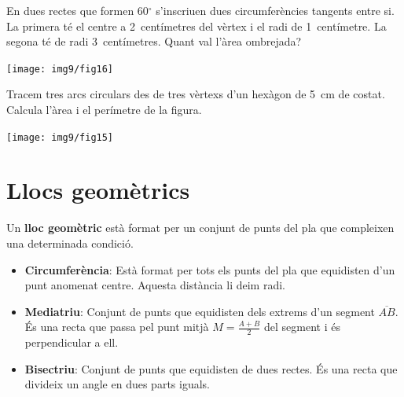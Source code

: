\begin{mylist}
 
\vspace{-1.5cm}
\exer \begin{minipage}[t]{0.62\textwidth}
	En dues rectes que formen 60${}^\circ$  s'inscriuen dues circumferències tangents entre si.  La primera té el centre a 2~centímetres del vèrtex i el radi de 1~centímetre. La segona  té de radi 3~centímetres. Quant val l'àrea ombrejada? 
	
\end{minipage}
\begin{minipage}{0.3\textwidth}
	\centering
	\vspace{1.5cm}
	\texttt{[image: img9/fig16]}
\end{minipage}
 
 
 \vspace{-1.5cm}
 \exer[1] \begin{minipage}[t]{0.62\textwidth}
 	 Tracem tres arcs circulars des de tres vèrtexs d'un hexàgon de 5~cm de costat. Calcula l'àrea i el perímetre de la figura.
 \end{minipage}
 \begin{minipage}{0.3\textwidth}
 	\centering
 	\vspace{1.5cm}
 	\texttt{[image: img9/fig15]}
 \end{minipage}
  
 
\end{mylist}
 
\section{Llocs geomètrics}

\begin{theorybox}
	Un \textbf{lloc geomètric} està format per un conjunt de punts del pla que compleixen una determinada condició.
	
	\begin{itemize}	
		\item \textbf{Circumferència}: Està format per tots els punts del pla que equidisten d'un punt anomenat centre. Aquesta distància li deim radi.
		
		\item \textbf{Mediatriu}: Conjunt de punts que equidisten dels extrems d'un segment $\overline{AB}$. És una recta que passa pel punt mitjà $M=\frac{A+B}{2}$ del segment i és perpendicular a ell.
		
		\item \textbf{Bisectriu}: Conjunt de punts que equidisten de dues rectes. És una recta que divideix un angle en dues parts iguals.
\end{itemize} 
\end{theorybox}

